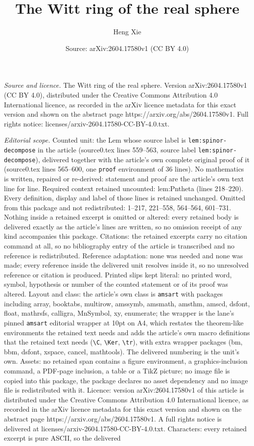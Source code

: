 \documentclass[10pt,a4paper]{amsart}
\title[The Witt ring of the real sphere]{The Witt ring of the real sphere}
\author{Heng Xie}
\date{Source: arXiv:2604.17580v1 (CC BY 4.0)}
\begin{document}
\maketitle

\noindent\emph{Source and licence.} The Witt ring of the real sphere. Version arXiv:2604.17580v1 (CC BY 4.0), distributed under the Creative Commons Attribution 4.0 International licence, as recorded in the arXiv licence metadata for this exact version and shown on the abstract page https://arxiv.org/abs/2604.17580v1. Full rights notice: licenses/arxiv-2604.17580-CC-BY-4.0.txt.\par\smallskip

\noindent\textit{Editorial scope.} Counted unit: the Lem whose source label is \texttt{lem:spinor-decompose} in the article (source0.tex lines 559--563, source label \texttt{lem:spinor-decompose}), delivered together with the article's own complete original proof of it (source0.tex lines 565--600, one \texttt{proof} environment of 36 lines). No mathematics is written, repaired or re-derived: statement and proof are the article's own text line for line. Required context retained uncounted: lem:Pntheta (lines 218--220). Every definition, display and label of those lines is retained unchanged. Omitted from this package and not redistributed: 1--217, 221--558, 564--564, 601--731. Nothing inside a retained excerpt is omitted or altered: every retained body is delivered exactly as the article's lines are written, so no omission receipt of any kind accompanies this package. Citations: the retained excerpts carry no citation command at all, so no bibliography entry of the article is transcribed and no reference is redistributed. Reference adaptation: none was needed and none was made; every reference inside the delivered unit resolves inside it, so no unresolved reference or citation is produced. Printed slips kept literal: no printed word, symbol, hypothesis or number of the counted statement or of its proof was altered. Layout and class: the article's own class is \texttt{amsart} with packages including array, booktabs, multirow, amssymb, amsmath, amsthm, amscd, dsfont, float, mathrsfs, calligra, MnSymbol, xy, enumerate; the wrapper is the lane's pinned \texttt{amsart} editorial wrapper at 10pt on A4, which restates the theorem-like environments the retained text needs and adds the article's own macro definitions that the retained text needs (\texttt{\textbackslash C}, \texttt{\textbackslash Ker}, \texttt{\textbackslash tr}), with extra wrapper packages (bm, bbm, dsfont, xspace, cancel, mathtools). The delivered numbering is the unit's own. Assets: no retained span contains a figure environment, a graphics-inclusion command, a PDF-page inclusion, a table or a TikZ picture; no image file is copied into this package, the package declares no asset dependency and no image file is redistributed with it. Licence: version arXiv:2604.17580v1 of this article is distributed under the Creative Commons Attribution 4.0 International licence, as recorded in the arXiv licence metadata for this exact version and shown on the abstract page https://arxiv.org/abs/2604.17580v1. A full rights notice is delivered at licenses/arxiv-2604.17580-CC-BY-4.0.txt. Characters: every retained excerpt is pure ASCII, so the delivered 
\end{document}
